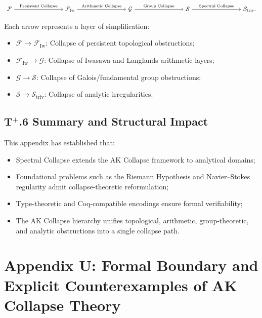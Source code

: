 \documentclass[11pt]{article}
\begin{document}
\[
\begin{tikzcd}[column sep=3cm]
\mathcal{F} \arrow[r, "\text{Persistent Collapse}"]
& \mathcal{F}_{\mathrm{Iw}} \arrow[r, "\text{Arithmetic Collapse}"]
& \mathcal{G} \arrow[r, "\text{Group Collapse}"]
& \mathcal{S} \arrow[r, "\text{Spectral Collapse}"]
& \mathcal{S}_{\mathrm{triv}}.
\end{tikzcd}
\]


Each arrow represents a layer of simplification:
\begin{itemize}
    \item $\mathcal{F} \to \mathcal{F}_{\mathrm{Iw}}$: Collapse of persistent topological obstructions;
    \item $\mathcal{F}_{\mathrm{Iw}} \to \mathcal{G}$: Collapse of Iwasawa and Langlands arithmetic layers;
    \item $\mathcal{G} \to \mathcal{S}$: Collapse of Galois/fundamental group obstructions;
    \item $\mathcal{S} \to \mathcal{S}_{\mathrm{triv}}$: Collapse of analytic irregularities.
\end{itemize}

\subsection*{T$^{+}$.6 Summary and Structural Impact}

This appendix has established that:
\begin{itemize}
    \item Spectral Collapse extends the AK Collapse framework to analytical domains;
    \item Foundational problems such as the Riemann Hypothesis and Navier–Stokes regularity admit collapse-theoretic reformulation;
    \item Type-theoretic and Coq-compatible encodings ensure formal verifiability;
    \item The AK Collapse hierarchy unifies topological, arithmetic, group-theoretic, and analytic obstructions into a single collapse path.
\end{itemize}




\section*{Appendix U: Formal Boundary and Explicit Counterexamples of AK Collapse Theory}
\end{document}

